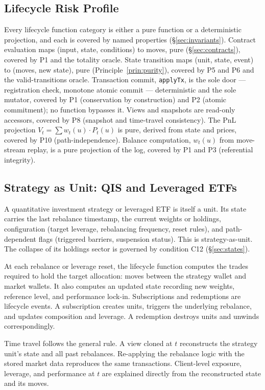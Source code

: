 \subsection{Lifecycle Risk Profile}
\label{sec:risk-profile}

Every lifecycle function category is either a pure function or a deterministic projection, and each is covered by named properties (\S\ref{sec:invariants}). Contract evaluation maps (input, state, conditions) to moves, pure (\S\ref{sec:contracts}), covered by P1 and the totality oracle. State transition maps (unit, state, event) to (moves, new state), pure (Principle~\ref{prin:purity}), covered by P5 and P6 and the valid-transitions oracle. Transaction commit, \texttt{applyTx}, is the sole door --- registration check, monotone atomic commit --- deterministic and the sole mutator, covered by P1 (conservation by construction) and P2 (atomic commitment); no function bypasses it. Views and snapshots are read-only accessors, covered by P8 (snapshot and time-travel consistency). The PnL projection $V_t = \sum w_t(u) \cdot P_t(u)$ is pure, derived from state and prices, covered by P10 (path-independence). Balance computation, $w_t(u)$ from move-stream replay, is a pure projection of the log, covered by P1 and P3 (referential integrity).

\subsection{Strategy as Unit: QIS and Leveraged ETFs}

A quantitative investment strategy or leveraged ETF is itself a unit. Its state carries the last rebalance timestamp, the current weights or holdings, configuration (target leverage, rebalancing frequency, reset rules), and path-dependent flags (triggered barriers, suspension status). This is strategy-as-unit. The collapse of its holdings sector is governed by condition C12 (\S\ref{sec:states}).

At each rebalance or leverage reset, the lifecycle function computes the trades required to hold the target allocation: moves between the strategy wallet and market wallets. It also computes an updated state recording new weights, reference level, and performance lock-in. Subscriptions and redemptions are lifecycle events. A subscription creates units, triggers the underlying rebalance, and updates composition and leverage. A redemption destroys units and unwinds correspondingly.

Time travel follows the general rule. A view cloned at $t$ reconstructs the strategy unit's state and all past rebalances. Re-applying the rebalance logic with the stored market data reproduces the same transactions. Client-level exposure, leverage, and performance at $t$ are explained directly from the reconstructed state and its moves.

